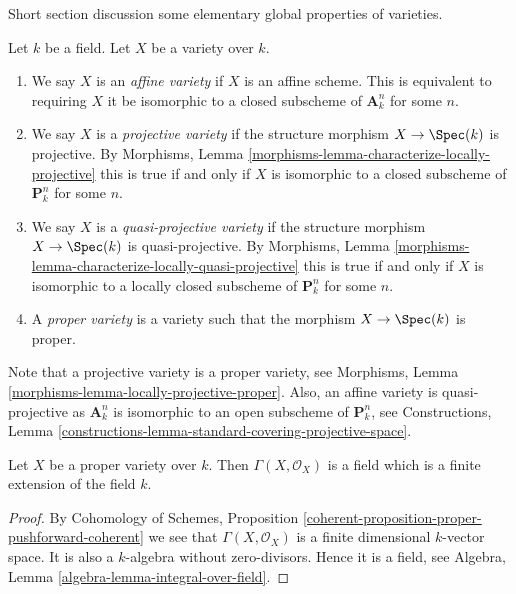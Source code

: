 \noindent
Short section discussion some elementary global properties of varieties.

\begin{definition}
\label{definition-variety-type}
Let $k$ be a field. Let $X$ be a variety over $k$.
\begin{enumerate}
\item We say $X$ is an {\it affine variety} if $X$ is an affine scheme.
This is equivalent to requiring $X$ it be isomorphic to a closed
subscheme of $\mathbf{A}^n_k$ for some $n$.
\item We say $X$ is a {\it projective variety} if the
structure morphism $X \to \Spec(k)$ is projective. By
Morphisms, Lemma \ref{morphisms-lemma-characterize-locally-projective}
this is true if and only if $X$ is isomorphic to a closed
subscheme of $\mathbf{P}^n_k$ for some $n$.
\item We say $X$ is a {\it quasi-projective variety} if
the structure morphism $X \to \Spec(k)$ is quasi-projective. By
Morphisms, Lemma \ref{morphisms-lemma-characterize-locally-quasi-projective}
this is true if and only if $X$ is isomorphic to a
locally closed subscheme of $\mathbf{P}^n_k$ for some $n$.
\item A {\it proper variety} is a variety such that the
morphism $X \to \Spec(k)$ is proper.
\end{enumerate}
\end{definition}

\noindent
Note that a projective variety is a proper variety, see
Morphisms, Lemma \ref{morphisms-lemma-locally-projective-proper}.
Also, an affine variety is quasi-projective as $\mathbf{A}^n_k$
is isomorphic to an open subscheme of $\mathbf{P}^n_k$, see
Constructions,
Lemma \ref{constructions-lemma-standard-covering-projective-space}.

\begin{lemma}
\label{lemma-regular-functions-proper-variety}
Let $X$ be a proper variety over $k$.
Then $\Gamma(X, \mathcal{O}_X)$ is a field which is
a finite extension of the field $k$.
\end{lemma}

\begin{proof}
By Cohomology of Schemes, Proposition
\ref{coherent-proposition-proper-pushforward-coherent}
we see that $\Gamma(X, \mathcal{O}_X)$ is a finite dimensional
$k$-vector space. It is also a $k$-algebra without zero-divisors.
Hence it is a field, see
Algebra, Lemma \ref{algebra-lemma-integral-over-field}.
\end{proof}




